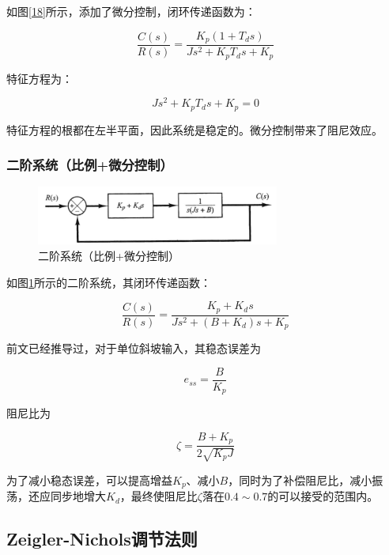 如图\ref{18}所示，添加了微分控制，闭环传递函数为：

\begin{equation*}
\frac{C(s)}{R(s)}=\frac{K_p(1+T_ds)}{Js^2+K_pT_ds+K_p}
\end{equation*}

特征方程为：

\begin{equation*}
Js^2+K_pT_ds+K_p=0
\end{equation*}

特征方程的根都在左半平面，因此系统是稳定的。微分控制带来了阻尼效应。

\subsubsection{二阶系统（比例+微分控制）}

\begin{figure}[!ht]
	\centering
	\includegraphics[width=8cm]{figures/19.png}
	\caption{二阶系统（比例+微分控制）}
	\label{19}
\end{figure}

如图\ref{19}所示的二阶系统，其闭环传递函数：

\begin{equation*}
\frac{C(s)}{R(s)}=\frac{K_p+K_ds}{Js^2+(B+K_d)s+K_p}
\end{equation*}

前文已经推导过，对于单位斜坡输入，其稳态误差为

\begin{equation*}
e_{ss}=\frac{B}{K_p}
\end{equation*}

阻尼比为

\begin{equation*}
\zeta=\frac{B+K_p}{2\sqrt{K_pJ}}
\end{equation*}

为了减小稳态误差，可以提高增益$K_p$、减小$B$，同时为了补偿阻尼比，减小振荡，还应同步地增大$K_d$，最终使阻尼比$\zeta$落在$0.4\sim0.7$的可以接受的范围内。


\subsection{Zeigler-Nichols调节法则}

